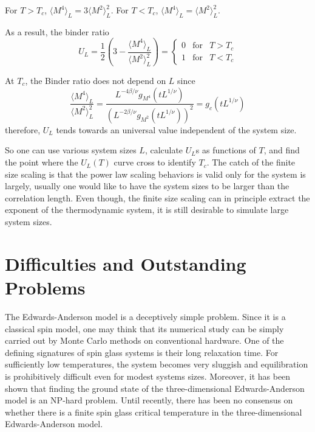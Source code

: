 For $T>T_c$, $\langle M^4\rangle_L = 3 \langle M^2\rangle_L^2$. 
For $T<T_c$, $\langle M^4\rangle_L = \langle M^2\rangle_L^2$.

As a result, the binder ratio
\begin{equation}
  \label{eq:16}
  U_L=\frac{1}{2}\left(3-\frac{\langle M^4\rangle_L}{\langle M^2\rangle^2_L}\right)
  =\left\{
    \begin{array}{ccc}
      0 & \mathrm{for} & T>T_c\\
      1 & \mathrm{for} & T<T_c
    \end{array}
  \right.
\end{equation}

At $T_c$, the Binder ratio does not depend on $L$ since
\begin{equation}
  \label{eq:15}
  \frac{\langle M^4\rangle_L}{\langle M^2\rangle^2_L}
  =\frac{L^{-4\beta/\nu}g_{M^4}(tL^{1/\nu})}{\left(L^{-2\beta/\nu}g_{M^2}(tL^{1/\nu})\right)^2}
  =g_c(tL^{1/\nu})
\end{equation}
therefore, $U_L$ tends towards an universal value independent of the system size.

So one can use various system sizes $L$, calculate $U_L$s as functions of $T$,
and find the point where the $U_L(T)$ curve cross to identify $T_c$. The catch
of the finite size scaling is that the power law scaling behaviors is valid
only for the system is largely, usually one would like to have the system
sizes to be larger than the correlation length. Even though, the finite size
scaling can in principle extract the exponent of the thermodynamic system,
it is still desirable to simulate large system sizes.
  
\section{Difficulties and Outstanding Problems}
The Edwards-Anderson model is a deceptively simple problem. Since it is a classical spin 
model, one may think that its numerical study can be simply carried out by Monte
Carlo methods on conventional hardware. One of the defining signatures of spin glass 
systems is their long relaxation time. 
For sufficiently low temperatures, the system becomes very sluggish and 
equilibration is prohibitively difficult even for modest systems sizes. 
Moreover, it has been shown that finding the ground state of the three-dimensional
Edwards-Anderson model is an NP-hard problem. \cite{Barahona-1982,} 
Until recently, there has been no consensus on whether there is a finite spin 
glass critical temperature in the three-dimensional Edwards-Anderson model.

